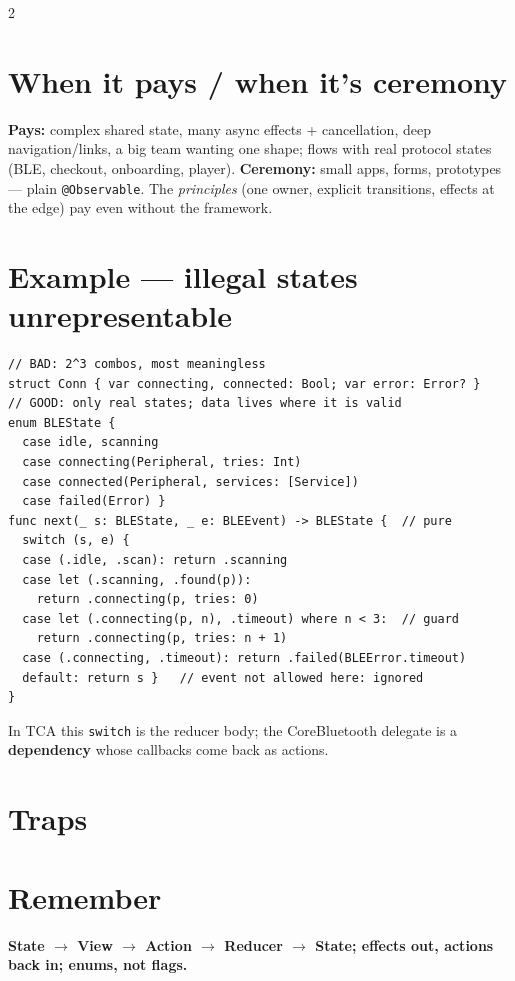 \documentclass[8pt]{extarticle}
\begin{document}
\begin{multicols}{2}
\section{When it pays / when it's ceremony}
\textbf{Pays:} complex shared state, many async effects + cancellation, deep
navigation/links, a big team wanting one shape; flows with real protocol states (BLE,
checkout, onboarding, player). \textbf{Ceremony:} small apps, forms, prototypes — plain
\texttt{@Observable}. The \emph{principles} (one owner, explicit transitions, effects at
the edge) pay even without the framework.

\columnbreak

\section{Example — illegal states unrepresentable}
\begin{lstlisting}[language=SwiftSheet]
// BAD: 2^3 combos, most meaningless
struct Conn { var connecting, connected: Bool; var error: Error? }
// GOOD: only real states; data lives where it is valid
enum BLEState {
  case idle, scanning
  case connecting(Peripheral, tries: Int)
  case connected(Peripheral, services: [Service])
  case failed(Error) }
func next(_ s: BLEState, _ e: BLEEvent) -> BLEState {  // pure
  switch (s, e) {
  case (.idle, .scan): return .scanning
  case let (.scanning, .found(p)):
    return .connecting(p, tries: 0)
  case let (.connecting(p, n), .timeout) where n < 3:  // guard
    return .connecting(p, tries: n + 1)
  case (.connecting, .timeout): return .failed(BLEError.timeout)
  default: return s }   // event not allowed here: ignored
}
\end{lstlisting}
In TCA this \texttt{switch} is the reducer body; the CoreBluetooth delegate is a
\textbf{dependency} whose callbacks come back as actions.

\section{Traps}
\begin{itemize}
\end{itemize}

\section{Remember}
\textbf{State $\to$ View $\to$ Action $\to$ Reducer $\to$ State; effects out, actions
back in; enums, not flags.}

\end{multicols}

\end{document}
